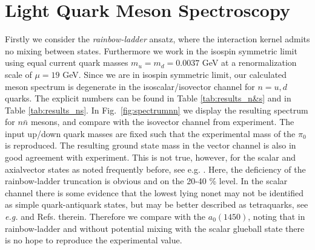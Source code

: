 \section{Light Quark Meson Spectroscopy}
%
Firstly we consider the \textit{rainbow-ladder} ansatz, where the interaction kernel admits no mixing between states. Furthermore we work in the isospin symmetric limit using equal current quark masses $m_u=m_d=0.0037$ GeV at a renormalization scale of $\mu = 19$ GeV. Since we are in isospin symmetric limit, our calculated meson spectrum is degenerate in the isoscalar/isovector channel for $n=u,d$ quarks. The explicit numbers can be found in Table \ref{tab:results_n&s} and in Table \ref{tab:results_ns}. In Fig.~\ref{fig:spectrumnn} we display the resulting spectrum for $n\bar{n}$ mesons, and compare with the isovector channel from experiment. The input up/down quark masses are fixed such that the experimental mass of the $\pi_0$ is reproduced. The resulting ground state mass in the vector channel is also in good agreement with experiment. This is not true, however, for the scalar and axialvector states as noted frequently before, see e.g. \cite{Watson:2004kd}. Here, the deficiency of the rainbow-ladder truncation is obvious and on the 20-40 \% level. In the scalar channel there is some evidence that the lowest lying nonet may not be identified as simple quark-antiquark states, but may be better described as tetraquarks, see {\it e.g.} \cite{Jaffe:1976ig,Giacosa:2006tf,Ebert:2008id,Parganlija:2012fy,Heupel:2012ua} and Refs. therein. Therefore we compare with the $a_0(1450)$, noting that in rainbow-ladder and without potential mixing with the scalar glueball state there is no hope to reproduce the experimental value. \\

